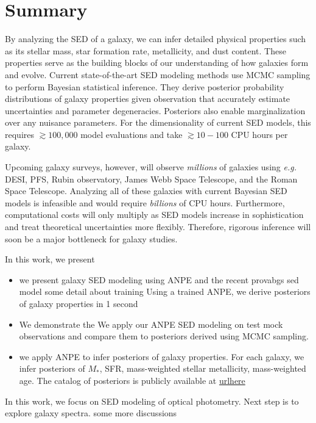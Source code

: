 \section{Summary} \label{sec:summary}
By analyzing the SED of a galaxy, we can infer detailed physical properties
such as its stellar mass, star formation rate, metallicity, and dust content. 
These properties serve as the building blocks of our understanding of how
galaxies form and evolve. 
Current state-of-the-art SED modeling methods use MCMC sampling to perform 
Bayesian statistical inference. 
They derive posterior probability distributions of galaxy properties given
observation that accurately estimate uncertainties and parameter degeneracies. 
Posteriors also enable marginalization over any nuisance parameters. 
For the dimensionality of current SED models, this requires ${\gtrsim}100,000$
model evaluations and take ${\gtrsim}10-100$ CPU hours per galaxy. 

Upcoming galaxy surveys, however, will observe \emph{millions} of galaxies
using \emph{e.g.} DESI, PFS, Rubin observatory, James Webb Space Telescope, and
the Roman Space Telescope. 
Analyzing all of these galaxies with current Bayesian SED models is infeasible
and would require \emph{billions} of CPU hours. 
Furthermore, computational costs will only multiply as SED models increase in 
sophistication and treat theoretical uncertainties more flexibly. 
Therefore, rigorous inference will soon be a major bottleneck for galaxy
studies. 

In this work, we present 
\begin{itemize}
\item we present galaxy SED modeling using ANPE and the recent provabgs sed model 
some detail about training 
Using a trained ANPE, we derive posteriors of galaxy properties in  1 second
\item We demonstrate the
We apply our ANPE SED modeling on test mock observations and compare them to
posteriors derived using MCMC sampling. 
\item we apply ANPE to infer posteriors of galaxy properties. 
For each galaxy, we infer posteriors of $M_*$, SFR, mass-weighted stellar
metallicity, mass-weighted age. 
The catalog of posteriors is publicly available at \url{urlhere}
\end{itemize}

In this work, we focus on SED modeling of optical photometry. 
Next step is to explore galaxy spectra. 
some more discussions 

